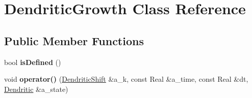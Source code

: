 \hypertarget{classDendriticGrowth}{}\section{Dendritic\+Growth Class Reference}
\label{classDendriticGrowth}
\subsection*{Public Member Functions}
\begin{DoxyCompactItemize}
\item 
\hypertarget{classDendriticGrowth_a30dda5137def030d930785b7a39e5cfd}{}bool {\bfseries is\+Defined} ()\label{classDendriticGrowth_a30dda5137def030d930785b7a39e5cfd}

\item 
\hypertarget{classDendriticGrowth_a29ccda56e5679491032a2136acb515e6}{}void {\bfseries operator()} (\hyperlink{classDendriticShift}{Dendritic\+Shift} \&a\+\_\+k, const Real \&a\+\_\+time, const Real \&dt, \hyperlink{classDendritic}{Dendritic} \&a\+\_\+state)\label{classDendriticGrowth_a29ccda56e5679491032a2136acb515e6}

\end{DoxyCompactItemize}
